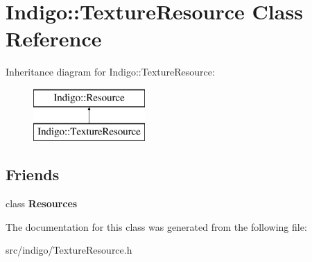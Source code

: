 \hypertarget{class_indigo_1_1_texture_resource}{}\section{Indigo\+:\+:Texture\+Resource Class Reference}
\label{class_indigo_1_1_texture_resource}
Inheritance diagram for Indigo\+:\+:Texture\+Resource\+:\begin{figure}[H]
\begin{center}
\leavevmode
\includegraphics[height=2.000000cm]{class_indigo_1_1_texture_resource}
\end{center}
\end{figure}
\subsection*{Friends}
\begin{DoxyCompactItemize}
\item 
\mbox{\label{class_indigo_1_1_texture_resource_a74b3f77e4a7285c624d30192f9643876}} 
class {\bfseries Resources}
\end{DoxyCompactItemize}


The documentation for this class was generated from the following file\+:\begin{DoxyCompactItemize}
\item 
src/indigo/Texture\+Resource.\+h\end{DoxyCompactItemize}
